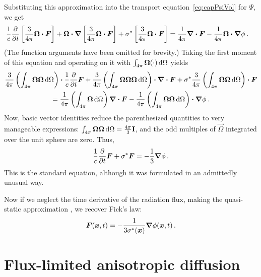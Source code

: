 Substituting this approximation into the transport equation~\eqref{eq:capPsiVol}
for $\Psi$, we get
\begin{align*}
  \frac{1}{c} \frac{\partial }{\partial t} \left[ \frac{3}{4\pi} \bm{\Omega} \bm{\cdot} \bm{F} \right]
  + \bm{\Omega}\bm{\cdot} \bm{\nabla} \left[ \frac{3}{4\pi} \bm{\Omega} \bm{\cdot} \bm{F} \right]
  + \sigma^\ast \left[ \frac{3}{4\pi} \bm{\Omega} \bm{\cdot} \bm{F} \right]
  &= \frac{1}{4\pi} \bm{\nabla} \bm{\cdot}\bm{F}
  - \frac{1}{4\pi} \bm{\Omega}\bm{\cdot} \bm{\nabla} \phi\,.
\end{align*}
(The function arguments have been omitted for brevity.)
Taking the first moment of this equation and operating on it with $\int_{4\pi}
\bm{\Omega}(\cdot) \mathop{}\!\mathrm{d}\Omega$ yields
\begin{multline*}
\frac{3}{4\pi} \left( \int_{4\pi} \bm{\Omega}\bm{\Omega}\mathop{}\!\mathrm{d}\Omega \right) \bm{\cdot}
\frac{1}{c} \frac{\partial }{\partial t} \bm{F}
+ \frac{3}{4\pi} \left( \int_{4\pi}
  \bm{\Omega}\bm{\Omega}\bm{\Omega}\mathop{}\!\mathrm{d}\Omega \right)
\bm{\cdot} \bm{\nabla} \bm{\cdot} \bm{F}
+ \sigma^\ast \frac{3}{4\pi} \left( \int_{4\pi}
\bm{\Omega}\bm{\Omega}\mathop{}\!\mathrm{d}\Omega \right) \bm{\cdot}\bm{F}
\\
= \frac{1}{4\pi} \left( \int_{4\pi} \bm{\Omega}\mathop{}\!\mathrm{d}\Omega \right)
\bm{\nabla} \bm{\cdot}\bm{F}
- \frac{1}{4\pi} \left( \int_{4\pi} \bm{\Omega}\bm{\Omega}\mathop{}\!\mathrm{d}\Omega \right)
\bm{\cdot} \bm{\nabla} \phi\,.
\end{multline*}
Now, basic vector identities \cite{Lar2007} reduce the parenthesized
quantities to very manageable expressions: $\int_{4\pi}
\bm{\Omega}\bm{\Omega}\mathop{}\!\mathrm{d}\Omega=\frac{4\pi}{3}\mathbf{I}$, and the odd
multiples of $\vec{\Omega}$ integrated over the unit sphere are zero. Thus,
\begin{equation*}
  \frac{1}{c} \frac{\partial }{\partial t} \bm{F}
  + \sigma^\ast \bm{F}
  =
  - \frac{1}{3} \bm{\nabla} \phi\,.
\end{equation*}
This is the standard \Pone{} equation, although it was formulated in an
admittedly unusual way.

Now if we neglect the time derivative of the radiation flux, making the
quasi-static approximation
\cite{Dud1976}, we recover Fick's law:
\begin{equation*}
\bm{F}(\bm{x}, t) = -\frac{1}{3\sigma^\ast(\bm{x})} \bm{\nabla}\phi(\bm{x}, t) \,.
\end{equation*}

\section{Flux-limited anisotropic diffusion}

